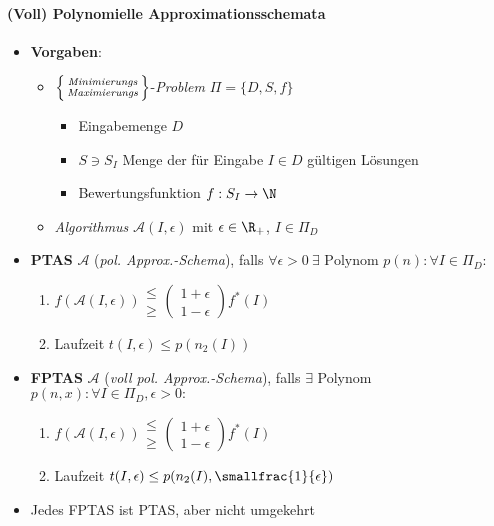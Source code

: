 \paragraph{(Voll) Polynomielle Approximationsschemata}
\begin{itemize}
  \item \textbf{Vorgaben}:
  \begin{itemize}
    \item $ \left\{ \begin{smallmatrix}
      \text{\emph{Minimierungs}} \\
      \text{\emph{Maximierungs}}
    \end{smallmatrix} \right\} $-\emph{Problem} $ \Pi = \{ D, S, f \} $
    \begin{itemize}
      \item Eingabemenge $ D $
      \item $ S \ni S_I $ Menge der für Eingabe $ I \in D $ gültigen Lösungen
      \item Bewertungsfunktion $ f: S_I \to \N $
    \end{itemize}
    \item \emph{Algorithmus} $ \mathcal{A}(I,\epsilon) $ mit $ \epsilon \in \R_{+} $, $ I \in \Pi_D $
  \end{itemize}
  \item \textbf{PTAS} $ \mathcal{A} $ (\emph{pol. Approx.-Schema}), falls $ \forall \epsilon > 0 \ \exists \text{ Polynom } p(n) : \forall I \in \Pi_D: $
  \begin{enumerate}
    \item $ f(\mathcal{A}(I,\epsilon))\begin{smallmatrix}
      \leq \\ \geq
    \end{smallmatrix}\left( \begin{smallmatrix}
      1+\epsilon \\
      1-\epsilon
    \end{smallmatrix} \right)f^*(I) $ 
    \item Laufzeit $ t(I, \epsilon) \leq p(n_2(I)) $
  \end{enumerate}
  \item \textbf{FPTAS} $ \mathcal{A} $ (\emph{voll pol. Approx.-Schema}), falls $ \exists $ Polynom $ p(n,x) : \forall I \in \Pi_D, \epsilon > 0: $
  \begin{enumerate}
    \item $ f(\mathcal{A}(I,\epsilon))\begin{smallmatrix}
      \leq \\ \geq
    \end{smallmatrix}\left( \begin{smallmatrix}
      1+\epsilon \\
      1-\epsilon
    \end{smallmatrix} \right)f^*(I) $
    \item Laufzeit $ t(I,\epsilon) \leq p(n_2(I),\smallfrac{1}{\epsilon}) $
  \end{enumerate}
  \item Jedes FPTAS ist PTAS, aber nicht umgekehrt
\end{itemize}

